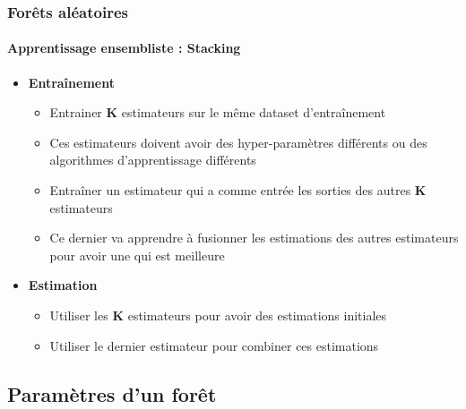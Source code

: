 \documentclass[xcolor=table]{beamer}
\begin{document}
\begin{frame}
	\frametitle{Forêts aléatoires}
	\framesubtitle{Apprentissage ensembliste : Stacking}
	
	\begin{itemize}
		\item \textbf{Entraînement}
		\begin{itemize}
			\item Entrainer \textbf{K} estimateurs sur le même dataset d'entraînement
			\item Ces estimateurs doivent avoir des hyper-paramètres différents ou des algorithmes d'apprentissage différents
			\item Entraîner un estimateur qui a comme entrée les sorties des autres \textbf{K} estimateurs 
			\item Ce dernier va apprendre à fusionner les estimations des autres estimateurs pour avoir une qui est meilleure
		\end{itemize}
		\item \textbf{Estimation}
		\begin{itemize}
			\item Utiliser les \textbf{K} estimateurs pour avoir des estimations initiales
			\item Utiliser le dernier estimateur pour combiner ces estimations
		\end{itemize}
	\end{itemize}
	
\end{frame}

\subsection{Paramètres d'un forêt}
\end{document}
